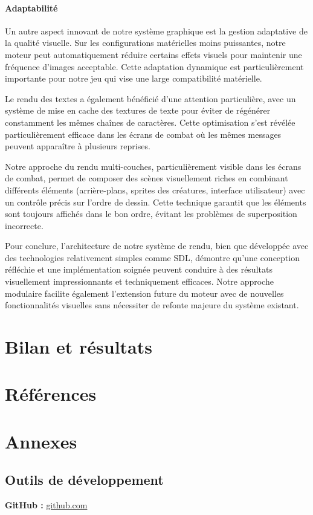 \documentclass[12pt,a4paper, twoside]{article}
\begin{document}
\paragraph{Adaptabilité} Un autre aspect innovant de notre système graphique est la gestion adaptative de la qualité visuelle. Sur les configurations matérielles moins puissantes, notre moteur peut automatiquement réduire certains effets visuels pour maintenir une fréquence d'images acceptable. Cette adaptation dynamique est particulièrement importante pour notre jeu qui vise une large compatibilité matérielle.

Le rendu des textes a également bénéficié d'une attention particulière, avec un système de mise en cache des textures de texte pour éviter de régénérer constamment les mêmes chaînes de caractères. Cette optimisation s'est révélée particulièrement efficace dans les écrans de combat où les mêmes messages peuvent apparaître à plusieurs reprises.

Notre approche du rendu multi-couches, particulièrement visible dans les écrans de combat, permet de composer des scènes visuellement riches en combinant différents éléments (arrière-plans, sprites des créatures, interface utilisateur) avec un contrôle précis sur l'ordre de dessin. Cette technique garantit que les éléments sont toujours affichés dans le bon ordre, évitant les problèmes de superposition incorrecte.

Pour conclure, l'architecture de notre système de rendu, bien que développée avec des technologies relativement simples comme SDL, démontre qu'une conception réfléchie et une implémentation soignée peuvent conduire à des résultats visuellement impressionnants et techniquement efficaces. Notre approche modulaire facilite également l'extension future du moteur avec de nouvelles fonctionnalités visuelles sans nécessiter de refonte majeure du système existant.
\newpage
\section{Bilan et résultats}
\section{Références}
\section{Annexes}

\subsection{Outils de développement}
\label{annexe:github}
\textbf{GitHub :} \href{https://github.com/Lounol72/ICPocket}{github.com}
\end{document}
